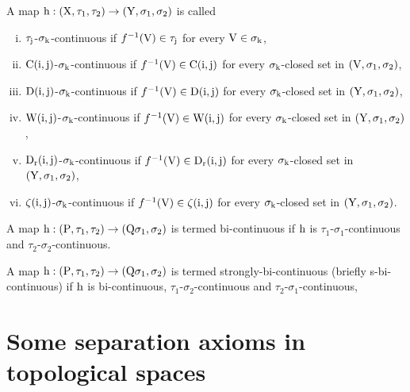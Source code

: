 \begin{dfn}\label{dfn1.6.2}
A map $\mathrm{h}:(\mathrm{X}, \tau_{1}, \tau_{2})\to (\mathrm{Y}, \sigma_{1}, \sigma_{2})$ is called
\begin{enumerate}[(i)]
\item $\tau_{\mathrm{j}}$-$\sigma_{\mathrm{k}}$-continuous \cite{Maki6} if $f^{-1}(\mathrm{V})\in \tau_{\mathrm{j}}$ for every $\mathrm{V}\in\sigma_{\mathrm{k}}$,

\item $\mathrm{C}(\mathrm{i},\mathrm{j})$-$\sigma_{\mathrm{k}}$-continuous \cite{Shaik John} if $f^{-1}(\mathrm{V})\in \mathrm{C}(\mathrm{i},\mathrm{j})$ for every $\sigma_{\mathrm{k}}$-closed set in $(\mathrm{V},\sigma_{1},\sigma_{2})$,

\item $\mathrm{D}(\mathrm{i},\mathrm{j})$-$\sigma_{\mathrm{k}}$-continuous \cite{Maki6} if $f^{-1}(\mathrm{V})\in \mathrm{D}(\mathrm{i},\mathrm{j})$ for every $\sigma_{\mathrm{k}}$-closed set in $(\mathrm{Y},\sigma_{1},\sigma_{2})$,

\item $\mathrm{W}(\mathrm{i},\mathrm{j})$-$\sigma_{\mathrm{k}}$-continuous \cite{Fukutake} if $f^{-1}(\mathrm{V})\in \mathrm{W}(\mathrm{i},\mathrm{j})$ for every $\sigma_{\mathrm{k}}$-closed set in $(\mathrm{Y},\sigma_{1},\sigma_{2})$,

\item $\mathrm{D}_{\mathrm{r}}(\mathrm{i},\mathrm{j})$-$\sigma_{\mathrm{k}}$-continuous \cite{Arockiarani} if $f^{-1}(\mathrm{V})\in \mathrm{D}_{\mathrm{r}}(\mathrm{i},\mathrm{j})$ for every $\sigma_{\mathrm{k}}$-closed set in $(\mathrm{Y},\sigma_{1},\sigma_{2})$,

\item $\zeta(\mathrm{i},\mathrm{j})$-$\sigma_{\mathrm{k}}$-continuous \cite{Gnanambal} if $f^{-1}(\mathrm{V})\in\zeta(\mathrm{i},\mathrm{j})$ for every $\sigma_{\mathrm{k}}$-closed set in $(\mathrm{Y},\sigma_{1},\sigma_{2})$.
\end{enumerate}
\end{dfn}

\begin{dfn}\label{dfn1.6.3}
A map $\mathrm{h}: (\mathrm{P}, \tau_1, \tau_2)\rightarrow(\mathrm{Q} \sigma_1, \sigma_2)$ is termed bi-continuous \cite{Maki6} if $\mathrm{h}$ is $\tau_1$-$\sigma_1$-continuous and $\tau_2$-$\sigma_2$-continuous.
\end{dfn}

\begin{dfn}\label{dfn1.6.4}
A map $\mathrm{h}: (\mathrm{P}, \tau_1, \tau_2)\rightarrow(\mathrm{Q} \sigma_1, \sigma_2)$ is termed strongly-bi-continuous \cite{Maki6} (briefly s-bi-continuous) if $\mathrm{h}$ is bi-continuous, $\tau_1$-$\sigma_2$-continuous and $\tau_2$-$\sigma_1$-continuous,
\end{dfn}

\section{Some separation axioms in topological spaces}

